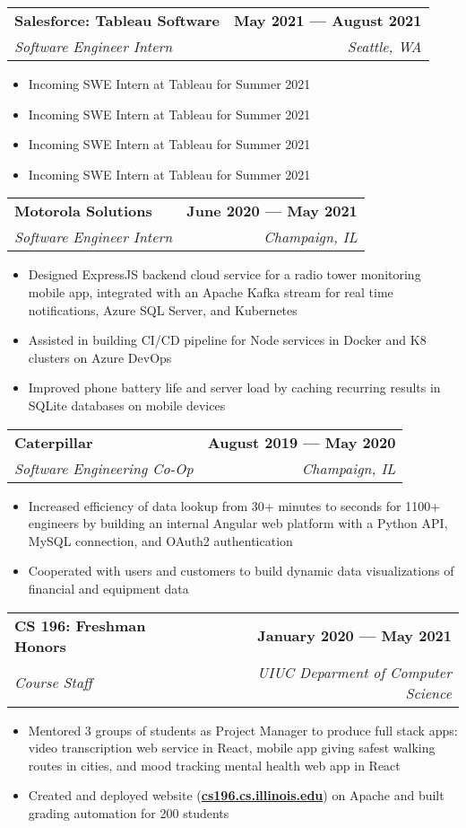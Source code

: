 \documentclass[letterpaper,10pt]{article}
\makeatletter
\newcommand{\resumeItem}[1]{
  \item\small{
    {#1 \vspace{-2pt}}
  }
}
\newcommand{\resumeSubheading}[4]{
  \vspace{-2pt}
  \item
    \begin{tabular*}{1\textwidth}[t]{l@{\extracolsep{\fill}}r}
      \large{\textbf{#1}} & \small{\textbf{#2}} \\
      \textit{\small#3} & \textit{\small#4} \\
    \end{tabular*}\vspace{-7pt}
}
\newcommand{\resumeSubSubheading}[2]{
    \item
    \begin{tabular*}{0.97\textwidth}{l@{\extracolsep{\fill}}r}
      \textit{\small#1} & \textit{\small #2} \\
    \end{tabular*}\vspace{-7pt}
}
\newcommand{\resumeSubHeadingListEnd}{\end{itemize}}
\newcommand{\resumeItemListStart}{\begin{itemize}}
\newcommand{\resumeItemListEnd}{\end{itemize}\vspace{0pt}}
\makeatother
\begin{document}
    \resumeSubheading
      {Salesforce: Tableau Software} %
      {May 2021 --- August 2021} %
      {Software Engineer Intern} %
      {Seattle, WA} %
      \resumeItemListStart
        \resumeItem{Incoming SWE Intern at Tableau for Summer 2021}
        \resumeItem{Incoming SWE Intern at Tableau for Summer 2021}
        \resumeItem{Incoming SWE Intern at Tableau for Summer 2021}
        \resumeItem{Incoming SWE Intern at Tableau for Summer 2021}
      \resumeItemListEnd
      

    \resumeSubheading
      {Motorola Solutions} %
      {June 2020 --- May 2021} %
      {Software Engineer Intern} %
      {Champaign, IL} %
      \resumeItemListStart
        \resumeItem{Designed ExpressJS backend cloud service for a radio tower monitoring mobile app, integrated with an Apache Kafka stream for real time notifications, Azure SQL Server, and Kubernetes }
        \resumeItem{Assisted in building CI/CD pipeline for Node services in Docker and K8 clusters on Azure DevOps}
        \resumeItem{Improved phone battery life and server load by caching recurring results in SQLite databases on mobile devices}
    \resumeItemListEnd

    \resumeSubheading
      {Caterpillar} %
      {August 2019 --- May 2020} %
      {Software Engineering Co-Op} %
      {Champaign, IL} %
      \resumeItemListStart
        \resumeItem{Increased efficiency of data lookup from 30+ minutes to seconds for 1100+ engineers by building an internal Angular web platform with a Python API, MySQL connection, and OAuth2 authentication }
        \resumeItem{Cooperated with users and customers to build dynamic data visualizations of financial and equipment data}
      \resumeItemListEnd

    \resumeSubheading
      {CS 196: Freshman Honors} %
      {January 2020 --- May 2021} %
      {Course Staff} %
      {UIUC Deparment of Computer Science} %
      \resumeItemListStart
        \resumeItem{Mentored 3 groups of students as Project Manager to produce full stack apps: video transcription web service in React, mobile app giving safest walking routes in cities, and mood tracking mental health web app in React}
        \resumeItem{Created and deployed website (\textbf{\href{http://cs196.cs.illinois.edu}{cs196.cs.illinois.edu}}) on Apache and built grading automation for 200 students}
      \resumeItemListEnd
\end{document}
